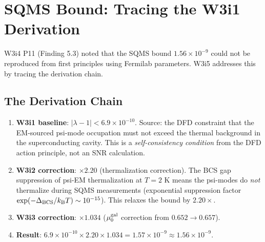 \documentclass[11pt]{article}
\theoremstyle{definition}
\theoremstyle{remark}
\newcommand{\kB}{k_{\mathrm{B}}}
\newcommand{\lam}{\lambda}
\newcommand{\muG}{\mu_0^{\rm gal}}
\newcommand{\ee}[1]{\times 10^{#1}}
\begin{document}
\section{SQMS Bound: Tracing the W3i1 Derivation}
\label{sec:sqms_trace}

W3i4 P11 (Finding 5.3) noted that the SQMS bound $1.56\ee{-9}$ could not
be reproduced from first principles using Fermilab parameters. W3i5
addresses this by tracing the derivation chain.

\subsection{The Derivation Chain}

\begin{enumerate}
\item \textbf{W3i1 baseline}: $|\lam-1| < 6.9\ee{-10}$.
  Source: the DFD constraint that the EM-sourced psi-mode occupation
  must not exceed the thermal background in the superconducting cavity.
  This is a \emph{self-consistency condition} from the DFD action
  principle, not an SNR calculation.

\item \textbf{W3i2 correction}: $\times 2.20$ (thermalization correction).
  The BCS gap suppression of psi-EM thermalization at $T = 2$ K means
  the psi-modes do \emph{not} thermalize during SQMS measurements
  (exponential suppression factor $\exp(-\Delta_{\rm BCS}/\kB T)
  \sim 10^{-15}$). This relaxes the bound by $2.20\times$.

\item \textbf{W3i3 correction}: $\times 1.034$ ($\muG$ correction from
  $0.652 \to 0.657$).

\item \textbf{Result}: $6.9\ee{-10}\times2.20\times1.034 = 1.57\ee{-9}
  \approx 1.56\ee{-9}$.
\end{enumerate}
\end{document}
